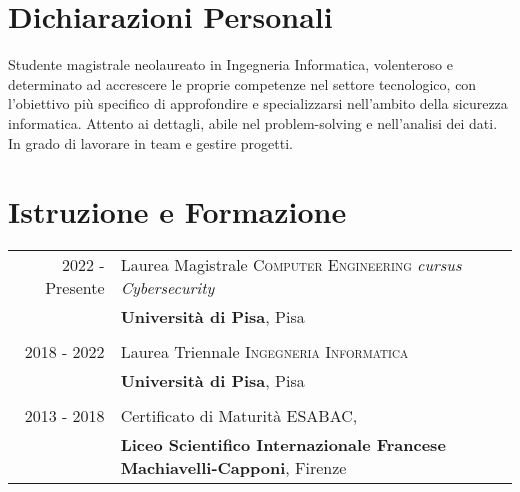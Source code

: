\documentclass[a4paper,10pt]{article} %
\begin{document}

\section{Dichiarazioni Personali}

Studente magistrale neolaureato in Ingegneria Informatica, volenteroso e determinato ad accrescere le proprie competenze nel settore tecnologico, 
con l'obiettivo più specifico di approfondire e specializzarsi nell'ambito della sicurezza informatica.
Attento ai dettagli, abile nel problem-solving e nell'analisi dei dati. In grado di lavorare in team e gestire progetti.



\section{Istruzione e Formazione}

\begin{tabular}{rl}	



2022 - Presente & Laurea Magistrale \textsc{Computer Engineering} \small\emph{cursus Cybersecurity}\\
& \textbf{Università di Pisa}, Pisa\\
&\\


2018 - 2022 & Laurea Triennale \textsc{Ingegneria Informatica}\\%
&\textbf{Università di Pisa}, Pisa\\
&\\


2013 - 2018 & Certificato di Maturità \textsc{ESABAC},\\
&\textbf{Liceo Scientifico Internazionale Francese Machiavelli-Capponi}, Firenze
\end{tabular}
\end{document}
